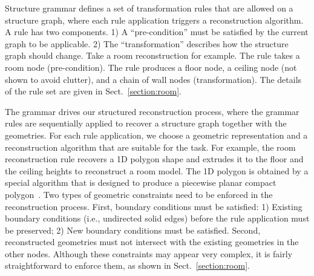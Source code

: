 Structure grammar defines a set of transformation rules that are allowed
on a structure graph, where each rule application triggers a
reconstruction algorithm. A rule has two components. 1) A
``pre-condition'' must be satisfied by the current graph to be
applicable. 2) The ``transformation'' describes how the
structure graph should change.
%
Take a room reconstruction for example. The rule takes a room node
(pre-condition). The rule produces a floor node, a ceiling node (not
shown to avoid clutter), and a chain of wall nodes (transformation).
The details of the rule set are given in Sect.~\ref{section:room}.

The grammar drives our structured reconstruction process,
where the grammar rules are sequentially applied to recover a structure
graph together with the geometries. For each rule application, we choose
a geometric representation and a reconstruction algorithm that are
suitable for the task. For example, the room reconstruction rule
recovers a 1D polygon shape and extrudes it to the floor and the ceiling
heights to reconstruct a room model. The 1D polygon is obtained by a
special algorithm that is designed to produce a piecewise planar compact
polygon~\cite{Cabral2014}.
%
Two types of geometric constraints need to be enforced in the
reconstruction process. First, boundary conditions must be satisfied: 1)
Existing boundary conditions (i.e., undirected solid edges) before the
rule application must be preserved; 2) New boundary conditions must be
satisfied. Second, reconstructed geometries must not intersect with the
existing geometries in the other nodes.
Although these constraints may appear very complex, it is fairly
straightforward to enforce them, as shown in Sect.~\ref{section:room}.

